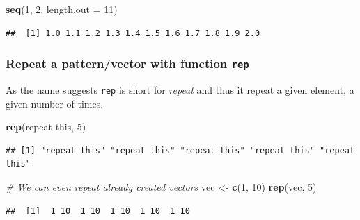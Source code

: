\documentclass[
]{book}
\newenvironment{Shaded}{\begin{snugshade}}{\end{snugshade}}
\newcommand{\AttributeTok}[1]{\textcolor[rgb]{0.13,0.29,0.53}{#1}}
\newcommand{\CommentTok}[1]{\textcolor[rgb]{0.56,0.35,0.01}{\textit{#1}}}
\newcommand{\DecValTok}[1]{\textcolor[rgb]{0.00,0.00,0.81}{#1}}
\newcommand{\FunctionTok}[1]{\textcolor[rgb]{0.13,0.29,0.53}{\textbf{#1}}}
\newcommand{\NormalTok}[1]{#1}
\newcommand{\OtherTok}[1]{\textcolor[rgb]{0.56,0.35,0.01}{#1}}
\newcommand{\StringTok}[1]{\textcolor[rgb]{0.31,0.60,0.02}{#1}}
\begin{document}
\begin{Shaded}
\begin{Highlighting}[]
\FunctionTok{seq}\NormalTok{(}\DecValTok{1}\NormalTok{, }\DecValTok{2}\NormalTok{, }\AttributeTok{length.out =} \DecValTok{11}\NormalTok{)}
\end{Highlighting}
\end{Shaded}

\begin{verbatim}
##  [1] 1.0 1.1 1.2 1.3 1.4 1.5 1.6 1.7 1.8 1.9 2.0
\end{verbatim}

\hypertarget{repeat-a-patternvector-with-function-rep}{%
\subsubsection*{\texorpdfstring{Repeat a pattern/vector with function \texttt{rep}}{Repeat a pattern/vector with function rep}}\label{repeat-a-patternvector-with-function-rep}}

As the name suggests \texttt{rep} is short for \emph{repeat} and thus it repeat a given element, a given number of times.

\begin{Shaded}
\begin{Highlighting}[]
\FunctionTok{rep}\NormalTok{(}\StringTok{\textquotesingle{}repeat this\textquotesingle{}}\NormalTok{, }\DecValTok{5}\NormalTok{)}
\end{Highlighting}
\end{Shaded}

\begin{verbatim}
## [1] "repeat this" "repeat this" "repeat this" "repeat this" "repeat this"
\end{verbatim}

\begin{Shaded}
\begin{Highlighting}[]
\CommentTok{\# We can even repeat already created vectors}
\NormalTok{vec }\OtherTok{\textless{}{-}} \FunctionTok{c}\NormalTok{(}\DecValTok{1}\NormalTok{, }\DecValTok{10}\NormalTok{)}
\FunctionTok{rep}\NormalTok{(vec, }\DecValTok{5}\NormalTok{)}
\end{Highlighting}
\end{Shaded}

\begin{verbatim}
##  [1]  1 10  1 10  1 10  1 10  1 10
\end{verbatim}
\end{document}

